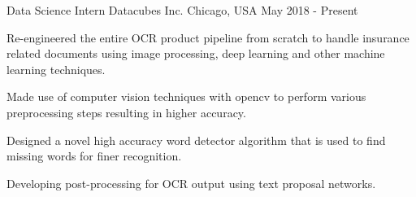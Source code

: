 

\begin{cventries}

  \cventry
    {Data Science Intern} %
    {Datacubes Inc.} %
    {Chicago, USA} %
    {May 2018 - Present} %
    {
      \begin{cvitems} %
        \item {Re-engineered the entire OCR product pipeline from scratch to handle insurance related documents using image processing, deep learning and other machine learning techniques.}
        \item {Made use of computer vision techniques with opencv to perform various preprocessing steps resulting in higher accuracy.}
        \item {Designed a novel high accuracy word detector algorithm that is used to find missing words for finer recognition.}
        \item {Developing post-processing for OCR output using text proposal networks.}
      \end{cvitems}
    }


\end{cventries}
